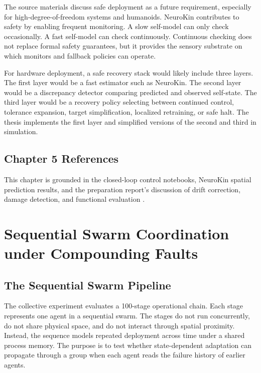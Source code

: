 \documentclass[12pt,a4paper,oneside]{report}
\begin{document}
The source materials discuss safe deployment as a future requirement, especially for high-degree-of-freedom systems and humanoids. NeuroKin contributes to safety by enabling frequent monitoring. A slow self-model can only check occasionally. A fast self-model can check continuously. Continuous checking does not replace formal safety guarantees, but it provides the sensory substrate on which monitors and fallback policies can operate.

For hardware deployment, a safe recovery stack would likely include three layers. The first layer would be a fast estimator such as NeuroKin. The second layer would be a discrepancy detector comparing predicted and observed self-state. The third layer would be a recovery policy selecting between continued control, tolerance expansion, target simplification, localized retraining, or safe halt. The thesis implements the first layer and simplified versions of the second and third in simulation.

\section*{Chapter 5 References}

This chapter is grounded in the closed-loop control notebooks, NeuroKin spatial prediction results, and the preparation report's discussion of drift correction, damage detection, and functional evaluation \cite{kwiatkowski2019task,chen2022full,hu2024teaching}.

\chapter{Sequential Swarm Coordination under Compounding Faults}

\section{The Sequential Swarm Pipeline}

The collective experiment evaluates a 100-stage operational chain. Each stage represents one agent in a sequential swarm. The stages do not run concurrently, do not share physical space, and do not interact through spatial proximity. Instead, the sequence models repeated deployment across time under a shared process memory. The purpose is to test whether state-dependent adaptation can propagate through a group when each agent reads the failure history of earlier agents.
\end{document}
